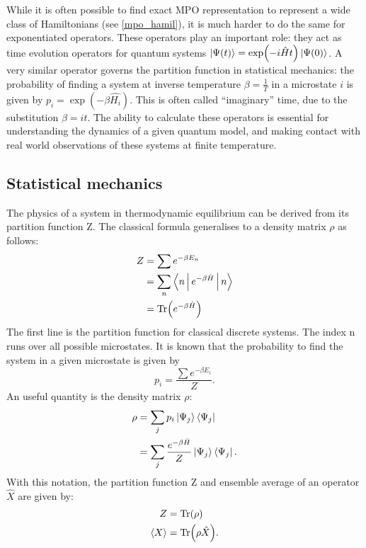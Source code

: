 
While it is often possible to find exact MPO representation to represent a wide class of Hamiltonians (see \cref{mpo_hamil}), it is much harder to do the same for exponentiated operators. These operators play an important role: they act as time evolution operators for quantum systems $ \ket{\Psi(t)} = \exp( -i \hat{H} t ) \ket{\Psi(0)}$. A very similar operator governs the partition function in statistical mechanics: the probability of finding a system at inverse temperature $\beta = \frac{1}{T}$ in a microstate $i$ is given by $p_i = \exp(  - \beta \hat{H_i} )$. This is often called “imaginary” time, due to the substitution $\beta = i t$. The ability to calculate these operators is essential for understanding the dynamics of a given quantum model, and making contact with real world observations of these systems at finite temperature.

\subsection{Statistical mechanics}\label{subsec:statmech}

The physics of a system in thermodynamic equilibrium can be derived from its partition function Z. The classical formula generalises to a density matrix $\rho$ as follows:
\begin{equation}
    \begin{split}
        Z &= \sum e^{ - \beta E_n} \\
        &= \sum_n \Braket{n | e^{ - \beta \hat{H} }  | n} \\
        &= \Tr( e^{ - \beta \hat{H} } )
    \end{split}
\end{equation}
The first line is the partition function for classical discrete systems. The index n runs over all possible microstates. It is known that the probability to find the system in a given microstate is given by
\begin{equation}
    p_i = \frac{\sum e^{ - \beta E_i}}{Z} .
\end{equation}
An useful quantity is the density matrix $\rho$:
\begin{equation}
    \begin{split}
        \rho &= \sum_j p_i  \Ket{ \Psi_j} \Bra{\Psi_j}   \\
        &= \sum_j \frac{ e^{ - \beta \hat{H} } }{Z}  \Ket{ \Psi_j} \Bra{\Psi_j} .
    \end{split}
\end{equation}
With this notation, the partition function Z and ensemble average of an operator $\hat{X}$ are given by:
\begin{equation}
    \begin{split}
        Z &= \Tr( \rho) \\
        \Braket{X} &= \Tr(\rho \hat{X}) .
    \end{split}
\end{equation}

